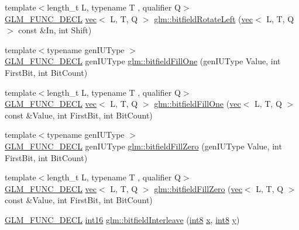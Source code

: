 \begin{DoxyCompactItemize}
\item 
{\footnotesize template$<$length\+\_\+t L, typename T , qualifier Q$>$ }\\\hyperlink{setup_8hpp_ab2d052de21a70539923e9bcbf6e83a51}{G\+L\+M\+\_\+\+F\+U\+N\+C\+\_\+\+D\+E\+CL} \hyperlink{structglm_1_1vec}{vec}$<$ L, T, Q $>$ \hyperlink{group__gtc__bitfield_gae186317091b1a39214ebf79008d44a1e}{glm\+::bitfield\+Rotate\+Left} (\hyperlink{structglm_1_1vec}{vec}$<$ L, T, Q $>$ const \&In, int Shift)
\item 
{\footnotesize template$<$typename gen\+I\+U\+Type $>$ }\\\hyperlink{setup_8hpp_ab2d052de21a70539923e9bcbf6e83a51}{G\+L\+M\+\_\+\+F\+U\+N\+C\+\_\+\+D\+E\+CL} gen\+I\+U\+Type \hyperlink{group__gtc__bitfield_ga46f9295abe3b5c7658f5b13c7f819f0a}{glm\+::bitfield\+Fill\+One} (gen\+I\+U\+Type Value, int First\+Bit, int Bit\+Count)
\item 
{\footnotesize template$<$length\+\_\+t L, typename T , qualifier Q$>$ }\\\hyperlink{setup_8hpp_ab2d052de21a70539923e9bcbf6e83a51}{G\+L\+M\+\_\+\+F\+U\+N\+C\+\_\+\+D\+E\+CL} \hyperlink{structglm_1_1vec}{vec}$<$ L, T, Q $>$ \hyperlink{group__gtc__bitfield_ga3e96dd1f0a4bc892f063251ed118c0c1}{glm\+::bitfield\+Fill\+One} (\hyperlink{structglm_1_1vec}{vec}$<$ L, T, Q $>$ const \&Value, int First\+Bit, int Bit\+Count)
\item 
{\footnotesize template$<$typename gen\+I\+U\+Type $>$ }\\\hyperlink{setup_8hpp_ab2d052de21a70539923e9bcbf6e83a51}{G\+L\+M\+\_\+\+F\+U\+N\+C\+\_\+\+D\+E\+CL} gen\+I\+U\+Type \hyperlink{group__gtc__bitfield_ga697b86998b7d74ee0a69d8e9f8819fee}{glm\+::bitfield\+Fill\+Zero} (gen\+I\+U\+Type Value, int First\+Bit, int Bit\+Count)
\item 
{\footnotesize template$<$length\+\_\+t L, typename T , qualifier Q$>$ }\\\hyperlink{setup_8hpp_ab2d052de21a70539923e9bcbf6e83a51}{G\+L\+M\+\_\+\+F\+U\+N\+C\+\_\+\+D\+E\+CL} \hyperlink{structglm_1_1vec}{vec}$<$ L, T, Q $>$ \hyperlink{group__gtc__bitfield_ga0d16c9acef4be79ea9b47c082a0cf7c2}{glm\+::bitfield\+Fill\+Zero} (\hyperlink{structglm_1_1vec}{vec}$<$ L, T, Q $>$ const \&Value, int First\+Bit, int Bit\+Count)
\item 
\hyperlink{setup_8hpp_ab2d052de21a70539923e9bcbf6e83a51}{G\+L\+M\+\_\+\+F\+U\+N\+C\+\_\+\+D\+E\+CL} \hyperlink{group__gtc__type__precision_ga2945a61d12771f8954994fcddf02b021}{int16} \hyperlink{group__gtc__bitfield_ga479134317bc95d99f2b2e235d3db287b}{glm\+::bitfield\+Interleave} (\hyperlink{group__gtc__type__precision_ga96254f9c1c4506fc8eb5cf3301ce8565}{int8} \hyperlink{_s_d_l__opengl_8h_ad0e63d0edcdbd3d79554076bf309fd47}{x}, \hyperlink{group__gtc__type__precision_ga96254f9c1c4506fc8eb5cf3301ce8565}{int8} \hyperlink{_s_d_l__opengl_8h_a1675d9d7bb68e1657ff028643b4037e3}{y})

\end{DoxyCompactItemize}
